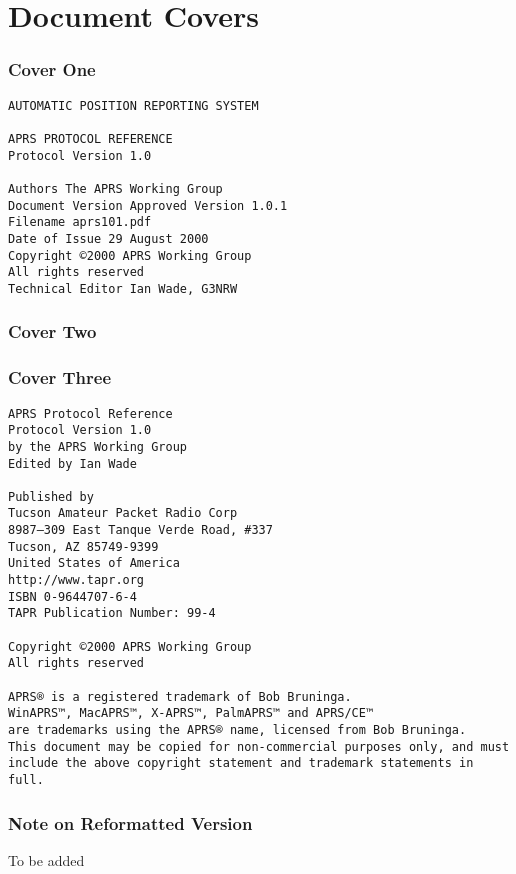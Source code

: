 \part*{Document Covers}
\section*{Cover One}

\begin{verbatim}
AUTOMATIC POSITION REPORTING SYSTEM

APRS PROTOCOL REFERENCE
Protocol Version 1.0

Authors The APRS Working Group
Document Version Approved Version 1.0.1
Filename aprs101.pdf
Date of Issue 29 August 2000
Copyright ©2000 APRS Working Group
All rights reserved
Technical Editor Ian Wade, G3NRW
\end{verbatim}


\section*{Cover Two}



\section*{Cover Three}

\begin{verbatim}
APRS Protocol Reference
Protocol Version 1.0
by the APRS Working Group
Edited by Ian Wade

Published by
Tucson Amateur Packet Radio Corp
8987–309 East Tanque Verde Road, #337
Tucson, AZ 85749-9399
United States of America
http://www.tapr.org
ISBN 0-9644707-6-4
TAPR Publication Number: 99-4

Copyright ©2000 APRS Working Group
All rights reserved

APRS® is a registered trademark of Bob Bruninga.
WinAPRS™, MacAPRS™, X-APRS™, PalmAPRS™ and APRS/CE™
are trademarks using the APRS® name, licensed from Bob Bruninga.
This document may be copied for non-commercial purposes only, and must
include the above copyright statement and trademark statements in full.
\end{verbatim}

\section*{Note on Reformatted Version}
To be added



